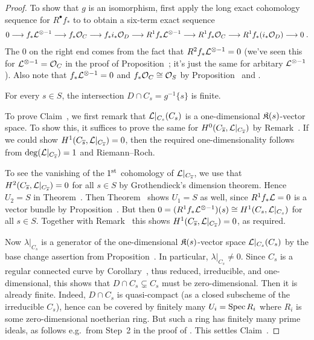 \documentclass[a4paper,parskip=half,numbers=enddot, DIV=12]{scrreprt}
\begin{document}
\begin{proof}
	To show that $g$ is an isomorphism, first apply the long exact cohomology sequence for $R^\bullet f_*$ to  to obtain a six-term exact sequence
	\begin{align*}%
		0\morphism f_*\Ll^{\otimes -1}\morphism f_*\Oo_C\morphism f_*i_*\Oo_D\morphism R^1f_*\Ll^{\otimes -1}\morphism R^1f_*\Oo_C\morphism R^1f_*(i_*\Oo_D)\morphism 0\;.
	\end{align*}
	The $0$ on the right end comes from the fact that $R^2f_*\mathcal{L}^{\otimes -1}=0$ (we've seen this for $\mathcal{L}^{\otimes -1}=\mathcal{O}_C$ in the proof of Proposition~; it's just the same for arbitary $\mathcal{L}^{\otimes -1}$). Also note that $f_*\mathcal{L}^{\otimes -1}=0$ and $f_*\mathcal{O}_C\cong\mathcal{O}_S$ by Proposition~ and .
	\begin{claim}
		For every $s\in S$, the intersection $D\cap C_s=g^{-1}\{s\}$ is finite.
	\end{claim}
	To prove Claim~, we first remark that $\mathcal{L}|_{C_s}(C_s)$ is a one-dimensional $\mathfrak{K}(s)$-vector space. To show this, it suffices to prove the same for $H^0(C_{\overline{s}},\mathcal{L}|_{C_{\overline{s}}})$ by Remark~. If we could show $H^1(C_{\overline{s}},\mathcal{L}|_{C_{\overline{s}}})=0$, then the required one-dimensionality follows from $\deg(\mathcal{L}|_{C_{\overline{s}}})=1$ and Riemann--Roch. 
	
	To see the vanishing of the $1^{\text{st}}$ cohomology of $\mathcal{L}|_{C_{\overline{s}}}$, we use that $H^2(C_{\overline{s}},\mathcal{L}|_{C_{\overline{s}}})=0$ for all $s\in S$ by Grothendieck's dimension theorem. Hence $U_2=S$ in Theorem~. Then Theorem~ shows $U_1=S$ as well, since $R^1f_*\mathcal{L}=0$ is a vector bundle by Proposition~. But then $0=(R^1f_*\mathcal{L}^{\otimes -1})(s)\cong H^1(C_s,\mathcal{L}|_{C_s})$ for all $s\in S$. Together with Remark~ this shows $H^1(C_{\overline{s}},\mathcal{L}|_{C_{\overline{s}}})=0$, as required.
	
	Now $\lambda|_{C_s}$ is a generator of the one-dimensional $\mathfrak{K}(s)$-vector space $\mathcal{L}|_{C_s}(C_s)$ by the base change assertion from Proposition~. In particular, $\lambda|_{C_s}\neq 0$. Since $C_s$ is a regular connected curve by Corollary~, thus reduced, irreducible, and one-dimensional, this shows that $D\cap C_s\subsetneq C_s$ must be zero-dimensional. Then it is already finite. Indeed, $D\cap C_s$ is quasi-compact (as a closed subscheme of the irreducible $C_s$), hence can be covered by finitely many $U_i=\operatorname{Spec} R_i$ where $R_i$ is some zero-dimensional noetherian ring. But such a ring has finitely many prime ideals, as follows e.g.\ from Step~2 in the proof of \cite[Proposition~3.1.1]{alg2}. This settles Claim~.
	

\end{proof}
\end{document}
